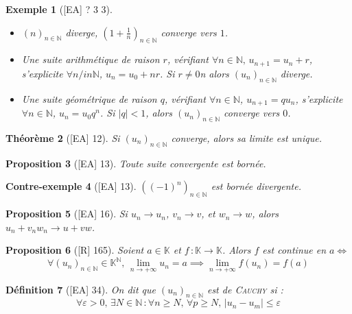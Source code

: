 \documentclass[10pt, a4paper, parskip=full, twoside, twocolumn]{report}
\newtheorem{definition}{Définition}
\newtheorem{theorem}[definition]{Théorème}
\newtheorem{proposition}[definition]{Proposition}
\newtheorem{example}[definition]{Exemple}
\newtheorem{cexample}[definition]{Contre-exemple}
\newcommand{\IN}{\mathbb{N}}
\newcommand{\IK}{\mathbb{K}}
\begin{document}
\begin{example}[\textnormal{[EA] ? 3 3}]
	\begin{itemize}
		\item $\left(n\right)_{n\in\IN}$ diverge, $\left(1+\frac{1}{n}\right)_{n\in\IN}$ converge vers $1$.
		\item Une \emph{suite arithmétique de raison $r$}, vérifiant $\forall n\in\IN,\, u_{n+1} = u_n + r$, s'explicite $\forall n/in \IN$, $u_n = u_0+nr$. Si $r \neq 0$n alors $\left(u_n\right)_{n\in \IN}$ diverge.
		\item Une \emph{suite géométrique de raison $q$}, vérifiant $\forall n\in \IN$, $u_{n+1} = qu_n$, s'explicite $\forall n\in\IN$, $u_n = u_0q^n$. Si $\vert q\vert < 1$, alors $\left(u_n\right)_{n\in\IN}$ converge vers $0$.
	\end{itemize}
\end{example}

\begin{theorem}[\textnormal{[EA] 12}]
	Si $\left(u_n\right)_{n\in\IN}$ converge, alors sa limite est unique.
\end{theorem}

\begin{proposition}[\textnormal{[EA] 13}]
	Toute suite convergente est bornée.
\end{proposition}

\begin{cexample}[\textnormal{[EA] 13}]
	$\left((-1)^n\right)_{n\in\IN}$ est bornée divergente.
\end{cexample}

\begin{proposition}[\textnormal{[EA] 16}]
	Si $u_n\to u_n$, $v_n\to v$, et $w_n\to w$, alors $u_n+v_nw_n\to u+vw$.
\end{proposition}

\begin{proposition}[\textnormal{[R] 165}]
	Soient $a\in\IK$ et $f\,\colon \IK\to\IK$. Alors $f$ est continue en $a \iff$
	$$\forall \left(u_n\right)_{n\in\IN} \in \IK^{\IN},\,\lim_{n\to +\infty} u_n = a \implies \lim_{n\to +\infty} f(u_n) = f(a)$$
\end{proposition}

\begin{definition}[\textnormal{[EA] 34}]
	On dit que $\left(u_n\right)_{n\in\IN}$ est \emph{de \textsc{Cauchy}} si :
	$$\forall \varepsilon > 0,\, \exists N\in \IN\,\colon \forall n\geq N,\, \forall p\geq N,\, \vert u_n - u_m\vert \leq \varepsilon$$
\end{definition}
\end{document}

